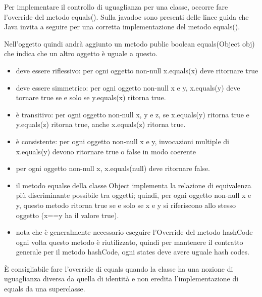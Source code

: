 \documentclass[a4paper,12pt,twoside]{book}
\begin{document}
Per implementare il controllo di uguaglianza per una classe, occorre
fare l’override del metodo equals().  Sulla javadoc sono presenti
delle linee guida che Java invita a seguire per una corretta
implementazione del metodo equals().

Nell'oggetto quindi andrà aggiunto un metodo public boolean
equals(Object obj) che indica che un altro oggetto è uguale a questo.
\begin{itemize}
\item deve essere riflessivo: per ogni oggetto non-null x.equals(x) deve
  ritornare true
\item deve essere simmetrico: per ogni oggetto non-null x e y,
  x.equals(y) deve tornare true se e solo se y.equals(x) ritorna true.
\item è transitivo: per ogni oggetto non-null x, y e z, se
  x.equals(y) ritorna true e y.equals(z) ritorna true, anche
  x.equals(z) ritorna true.
\item è consistente: per ogni oggetto non-null x e y,
  invocazioni multiple di x.equals(y) devono ritornare true o false in
  modo coerente
\item per ogni oggetto non-null x, x.equals(null) deve ritornare
  false.
\item il metodo equalse della classe Object implementa la relazione di
  equivalenza più discriminante possibile tra oggetti; quindi, per ogni
  oggetto non-null x e y, questo  metodo ritorna true se e solo se x e
  y si riferiscono allo stesso oggetto (x==y ha il valore true).
\item nota che è generalmente necessario eseguire l'Override del metodo
  hashCode ogni volta questo metodo è riutilizzato, quindi per
  mantenere il contratto generale per il metodo hashCode, ogni states
  deve avere uguale hash codes.
\end{itemize}

È consigliabile fare l'override di equals quando la classe ha una
nozione di uguaglianza diversa da quella di identità e non eredita
l'implementazione di equals da una superclasse.
\end{document}
